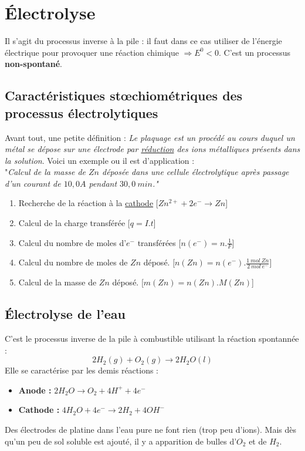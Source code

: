 \documentclass[british,french,11pt, a4paper, openany]{book}
\begin{document}
\section{Électrolyse}
Il s'agit du processus inverse à la pile : il faut dans ce cas utiliser de l'énergie électrique pour provoquer une réaction chimique $\Rightarrow E^0 <0$. C'est un processus \textbf{non-spontané}.

\subsection*{Caractéristiques stœchiométriques des processus électrolytiques}
Avant tout, une petite définition : \textit{Le plaquage est un procédé au cours duquel un métal se dépose sur une électrode par \underline{réduction} des ions métalliques présents dans la solution}. Voici un exemple ou il est d'application :\\

"\textit{Calcul de la masse de $Zn$ déposée dans une cellule électrolytique après passage d'un courant de $10,0A$ pendant $30,0\ min$."}
\begin{enumerate}
	\item Recherche de la réaction à la \underline{cathode} [$Zn^{2+} + 2e^- \rightarrow Zn$]
	\item Calcul de la charge transférée [$q = I.t$]
	\item Calcul du nombre de moles d'$e^-$ transférées [$n(e^-) = n.\frac{1}{F} $]
	\item Calcul du nombre de moles de $Zn$ déposé. [$n(Zn) = n(e^-).\frac{1\ mol\ Zn}{2\ mol\ e^-}$]
	\item Calcul de la masse de $Zn$ déposé. [$m(Zn) = n(Zn).M(Zn)$]
\end{enumerate}

\subsection{Électrolyse de l'eau}
C'est le processus inverse de la pile à combustible utilisant la réaction spontannée : 
$$2H_2 (g) + O_2 (g) \rightarrow 2 H_2O (l)$$
Elle se caractérise par les demis réactions :
\begin{itemize}
	\item \textbf{Anode :} $2H_2O \rightarrow O_2 + 4H^+ + 4e^-$
	\item \textbf{Cathode :} $4 H_2O + 4e^- \rightarrow 2 H_2 + 4 OH^-$
\end{itemize}
Des électrodes de platine dans l'eau pure ne font rien (trop peu d'ions). Mais dès qu'un peu de sol soluble est ajouté, il y a apparition de bulles d'$O_2$ et de $H_2$.\\
\end{document}
